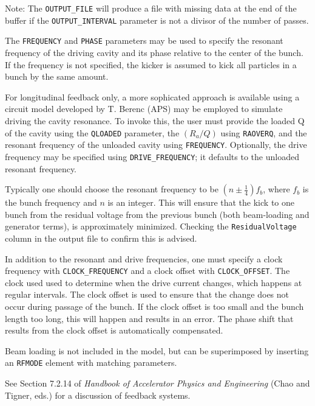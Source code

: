 Note: The \verb|OUTPUT_FILE| will produce a file with missing data at the end of
the buffer if the \verb|OUTPUT_INTERVAL| parameter is not a divisor of the number of passes.

The \verb|FREQUENCY| and \verb|PHASE| parameters may be used to specify the resonant frequency of 
the driving cavity and its phase relative to the center of the bunch.
If the frequency is not specified, the kicker is assumed to kick all particles in a bunch by the
same amount.

For longitudinal feedback only, a more sophicated approach is available using a
circuit model developed by T. Berenc (APS) may be employed to simulate driving the cavity resonance.
To invoke this, the user must provide the loaded Q of the cavity using the \verb|QLOADED| parameter,
the $(R_a/Q)$ using \verb|RAOVERQ|, and the resonant frequency of the unloaded 
cavity using \verb|FREQUENCY|. Optionally, the drive frequency may be specified using
\verb|DRIVE_FREQUENCY|; it defaults to the unloaded resonant frequency.

Typically one should choose the resonant frequency to be $(n\pm \frac{1}{4})f_b$, where
$f_b$ is the bunch frequency and $n$ is an integer.
This will ensure that the kick to one bunch from the residual voltage from the previous
bunch (both beam-loading and generator terms), is approximately minimized.
Checking the \verb|ResidualVoltage| column in the output file to confirm this is advised.

In addition to the resonant and drive frequencies, one must specify a clock frequency with
\verb|CLOCK_FREQUENCY| and a clock offset with \verb|CLOCK_OFFSET|. The clock used used to
determine when the drive current changes, which happens at regular intervals. The clock offset is used to 
ensure that the change does not occur during passage of the bunch. If the clock offset is too small and
the bunch length too long, this will happen and results in an error.
The phase shift that results from the clock offset is automatically compensated.

Beam loading is not included in the model, but can be superimposed by inserting an \verb|RFMODE| element
with matching parameters.


See Section 7.2.14 of {\em Handbook of Accelerator Physics and Engineering}
(Chao and Tigner, eds.) for a discussion of feedback systems.

